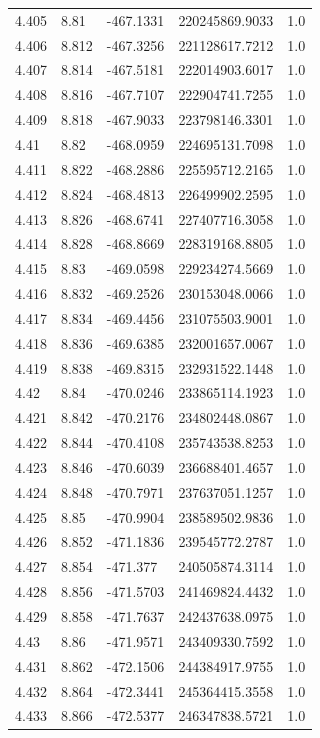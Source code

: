 \begin{tabular}{lllll}
4.405 & 8.81 & -467.1331 & 220245869.9033 & 1.0 \\
4.406 & 8.812 & -467.3256 & 221128617.7212 & 1.0 \\
4.407 & 8.814 & -467.5181 & 222014903.6017 & 1.0 \\
4.408 & 8.816 & -467.7107 & 222904741.7255 & 1.0 \\
4.409 & 8.818 & -467.9033 & 223798146.3301 & 1.0 \\
4.41 & 8.82 & -468.0959 & 224695131.7098 & 1.0 \\
4.411 & 8.822 & -468.2886 & 225595712.2165 & 1.0 \\
4.412 & 8.824 & -468.4813 & 226499902.2595 & 1.0 \\
4.413 & 8.826 & -468.6741 & 227407716.3058 & 1.0 \\
4.414 & 8.828 & -468.8669 & 228319168.8805 & 1.0 \\
4.415 & 8.83 & -469.0598 & 229234274.5669 & 1.0 \\
4.416 & 8.832 & -469.2526 & 230153048.0066 & 1.0 \\
4.417 & 8.834 & -469.4456 & 231075503.9001 & 1.0 \\
4.418 & 8.836 & -469.6385 & 232001657.0067 & 1.0 \\
4.419 & 8.838 & -469.8315 & 232931522.1448 & 1.0 \\
4.42 & 8.84 & -470.0246 & 233865114.1923 & 1.0 \\
4.421 & 8.842 & -470.2176 & 234802448.0867 & 1.0 \\
4.422 & 8.844 & -470.4108 & 235743538.8253 & 1.0 \\
4.423 & 8.846 & -470.6039 & 236688401.4657 & 1.0 \\
4.424 & 8.848 & -470.7971 & 237637051.1257 & 1.0 \\
4.425 & 8.85 & -470.9904 & 238589502.9836 & 1.0 \\
4.426 & 8.852 & -471.1836 & 239545772.2787 & 1.0 \\
4.427 & 8.854 & -471.377 & 240505874.3114 & 1.0 \\
4.428 & 8.856 & -471.5703 & 241469824.4432 & 1.0 \\
4.429 & 8.858 & -471.7637 & 242437638.0975 & 1.0 \\
4.43 & 8.86 & -471.9571 & 243409330.7592 & 1.0 \\
4.431 & 8.862 & -472.1506 & 244384917.9755 & 1.0 \\
4.432 & 8.864 & -472.3441 & 245364415.3558 & 1.0 \\
4.433 & 8.866 & -472.5377 & 246347838.5721 & 1.0 \\

\end{tabular}
